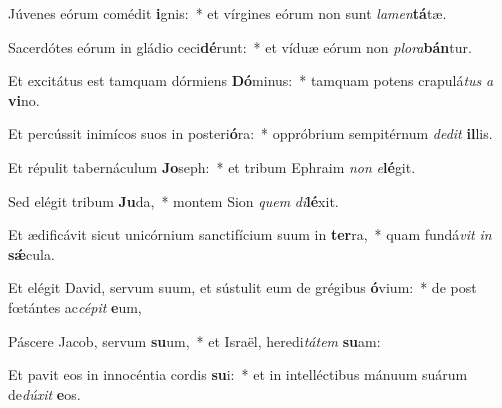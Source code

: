 \item Júvenes eórum comédit \textbf{i}gnis:~* et vírgines eórum non sunt \textit{la}\textit{men}\textbf{tá}tæ.
\item Sacerdótes eórum in gládio ceci\textbf{dé}runt:~* et víduæ eórum non \textit{plo}\textit{ra}\textbf{bán}tur.
\item Et excitátus est tamquam dórmiens \textbf{Dó}minus:~* tamquam potens crapulá\textit{tus} \textit{a} \textbf{vi}no.
\item Et percússit inimícos suos in posteri\textbf{ó}ra:~* oppróbrium sempitérnum \textit{de}\textit{dit} \textbf{il}lis.
\item Et répulit tabernáculum \textbf{Jo}seph:~* et tribum Ephraim \textit{non} \textit{e}\textbf{lé}git.
\item Sed elégit tribum \textbf{Ju}da,~* montem Sion \textit{quem} \textit{di}\textbf{lé}xit.
\item Et ædificávit sicut unicórnium sanctifícium suum in \textbf{ter}ra,~* quam fundá\textit{vit} \textit{in} \textbf{sǽ}cula.
\item Et elégit David, servum suum, et sústulit eum de grégibus \textbf{ó}vium:~* de post fœtántes ac\textit{cé}\textit{pit} \textbf{e}um,
\item Páscere Jacob, servum \textbf{su}um,~* et Israël, heredi\textit{tá}\textit{tem} \textbf{su}am:
\item Et pavit eos in innocéntia cordis \textbf{su}i:~* et in intelléctibus mánuum suárum de\textit{dú}\textit{xit} \textbf{e}os.
